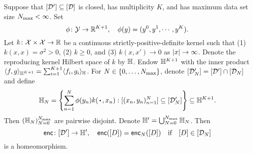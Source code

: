 \documentclass[12pt, twoside]{report}
\begin{document}
\begin{lemma}
    \label{lem:encoding_varying_size}
    Suppose that $[\mathcal{D}'] \subseteq [\mathcal{D}]$ is closed, has multiplicity $K$, and has maximum data set size $N\ss{max} < \infty$.
    Set
    \begin{equation}
        \phi\colon \mathcal{Y} \to \mathbb{R}^{K+1}, \quad
        \phi(y) = (y^0, y^1, \cdots, y^K).
    \end{equation}
    Let $k\colon \mathcal{X} \times \mathcal{X} \to \mathbb{R}$ be a continuous strictly-positive-definite kernel such that
    (1) $k(x, x) = \sigma^2 > 0$,
    (2) $k \ge 0$, and
    (3) $k(x, x') \to 0$ as $\lvert x\rvert \to \infty$.
    Denote the reproducing kernel Hilbert space of $k$ by $\mathbb{H}$.
    Endow $\mathbb{H}^{K+1}$ with the inner product $\langle f, g\rangle_{\mathbb{H}^{K+1}} = \sum_{i=1}^{K+1} \langle f_i, g_i\rangle_{\mathbb{H}}$.
    For $N \in \set{0, \ldots, N\ss{max}}$, denote $[\mathcal{D}'_N] = [\mathcal{D}'] \cap [\mathcal{D}_N]$ and define
    \begin{equation}
        \Hb_{N} = \set*{
            \sum_{n=1}^{N} \phi(y_n) k(\vardot, x_n) :
            [(x_n, y_n)_{n=1}^N] \sub [\D'_N]
        }
        \subseteq \Hb^{K+1}.
    \end{equation}
    Then $(\Hb_{N})_{N=0}^{N\ss{max}}$ are pairwise disjoint.
    Denote $\Hb' = \bigcup_{N=0}^{N\ss{max}} \Hb_{N}$.
    Then
    \begin{equation}
        \mathsf{enc}\colon
            [\mathcal{D}']
            \to
            \mathbb{H}',
        \quad
        \mathsf{enc}([D]) = \mathsf{enc}_{N}([D]) \quad \text{if} \quad [D] \in [\mathcal{D}_N]
    \end{equation}
    is a homeomorphism.
\end{lemma}
\end{document}
